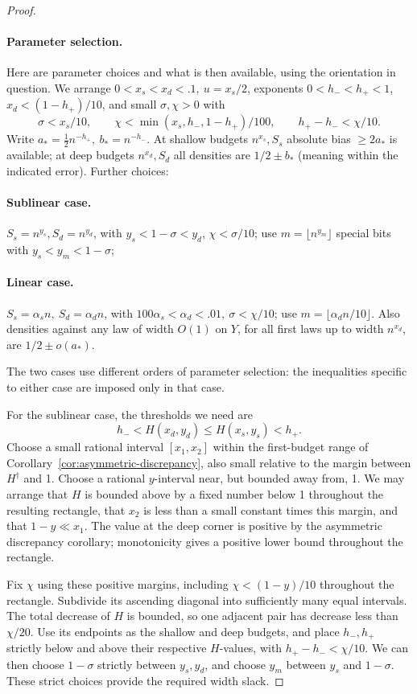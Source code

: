 \begin{proof}\leavevmode\par
\paragraph{Parameter selection.}
Here are parameter choices and what is then available, using the orientation in question. We arrange \(0<x_s<x_d<.1,\ u=x_s/2\), exponents \(0<h_-<h_+<1\), \(x_d<(1-h_+)/10\), and small \(\sigma,\chi>0\) with
\[
 \sigma<x_s/10,\qquad
 \chi<\min(x_s,h_-,1-h_+)/100,\qquad h_+-h_-<\chi/10.
\]
Write \(a_*=\tfrac12 n^{-h_+},\ b_*=n^{-h_-}\). At shallow budgets \(n^{x_s},S_s\) absolute bias \(\ge2a_*\) is available; at deep budgets \(n^{x_d},S_d\) all densities are \(1/2\pm b_*\) (meaning within the indicated error). Further choices:
\paragraph{Sublinear case.} \(S_s=n^{y_s}, S_d=n^{y_d}\), with \(y_s<1-\sigma<y_d\), \(\chi<\sigma/10\); use \(m=\lfloor n^{y_m}\rfloor\) special bits with \(y_s<y_m<1-\sigma\);
\paragraph{Linear case.} \(S_s=\alpha_s n,\ S_d=\alpha_d n\), with \(100\alpha_s<\alpha_d<.01,\ \sigma<\chi/10\); use \(m=\lfloor\alpha_d n/10\rfloor\). Also densities against any law of width \(O(1)\) on \(Y\), for all first laws up to width \(n^{x_d}\), are \(1/2\pm o(a_*)\).

The two cases use different orders of parameter selection: the inequalities specific to either case are imposed only in that case.

For the sublinear case, the thresholds we need are
\[
 h_-<H(x_d,y_d)\le H(x_s,y_s)<h_+.
\]
Choose a small rational interval \([x_1,x_2]\) within the first-budget range of Corollary~\ref{cor:asymmetric-discrepancy}, also small relative to the margin between \(H^\dagger\) and 1. Choose a rational \(y\)-interval near, but bounded away from, 1. We may arrange that \(H\) is bounded above by a fixed number below 1 throughout the resulting rectangle, that \(x_2\) is less than a small constant times this margin, and that \(1-y\ll x_1\). The value at the deep corner is positive by the asymmetric discrepancy corollary; monotonicity gives a positive lower bound throughout the rectangle.

Fix \(\chi\) using these positive margins, including \(\chi<(1-y)/10\) throughout the rectangle. Subdivide its ascending diagonal into sufficiently many equal intervals. The total decrease of \(H\) is bounded, so one adjacent pair has decrease less than \(\chi/20\). Use its endpoints as the shallow and deep budgets, and place \(h_-,h_+\) strictly below and above their respective \(H\)-values, with \(h_+-h_-<\chi/10\). We can then choose \(1-\sigma\) strictly between \(y_s,y_d\), and choose \(y_m\) between \(y_s\) and \(1-\sigma\). These strict choices provide the required width slack.


\end{proof}
